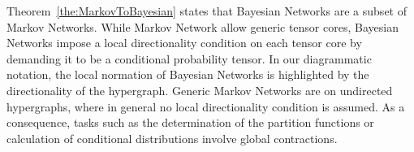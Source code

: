 
Theorem~\ref{the:MarkovToBayesian} states that Bayesian Networks are a subset of Markov Networks.
While Markov Network allow generic tensor cores, Bayesian Networks impose a local directionality condition on each tensor core by demanding it to be a conditional probability tensor.
In our diagrammatic notation, the local normation of Bayesian Networks is highlighted by the directionality of the hypergraph.
Generic Markov Networks are on undirected hypergraphs, where in general no local directionality condition is assumed.
As a consequence, tasks such as the determination of the partition functions or calculation of conditional distributions involve global contractions.





